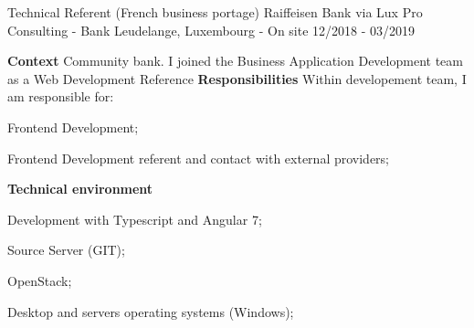 \begin{cventries}
  \cventry
    {Technical Referent (French business portage)} %
    {Raiffeisen Bank via Lux Pro Consulting - Bank} %
    {Leudelange, Luxembourg - On site} %
    {12/2018 - 03/2019} %
    {
      \textbf{Context}
      \newline
      Community bank. I joined the Business Application Development team as a Web Development Reference
      \newline \vspace{2pt}
      \textbf{Responsibilities}
      \newline \vspace{2pt}
      Within developement team, I am responsible for:
      \newline \vspace{12pt}
      \begin{cvitems}
        \item {Frontend Development;}
        \item {Frontend Development referent and contact with external providers;}
      \end{cvitems}
      \textbf{Technical environment}
      \newline \vspace{12pt}
      \begin{cvitems}
        \item {Development with Typescript and Angular 7;}
        \item {Source Server (GIT);}
        \item {OpenStack;}
        \item {Desktop and servers operating systems (Windows);}
      \end{cvitems}
    }


\end{cventries}
